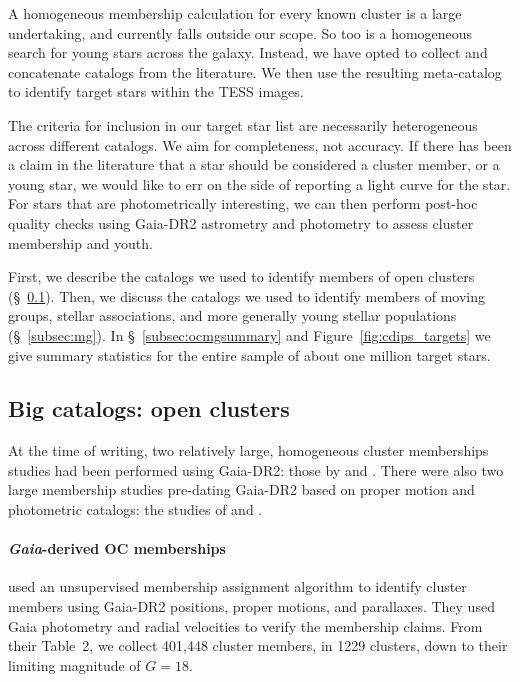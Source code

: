 \documentclass[12pt,twocolumn,tighten]{aastex62}
\begin{document}
A homogeneous membership calculation for every known cluster is a
large undertaking, and currently falls outside our scope.  So too is a
homogeneous search for young stars across the galaxy.  Instead, we
have opted to collect and concatenate catalogs from the literature.
We then use the resulting meta-catalog to identify target stars within
the TESS images.

The criteria for inclusion in our target star list are necessarily
heterogeneous across different catalogs.  We aim for completeness, not
accuracy.  If there has been a claim in the literature that a star
should be considered a cluster member, or a young star, we would like
to err on the side of reporting a light curve for the star.  For stars
that are photometrically interesting, we can then perform post-hoc
quality checks using Gaia-DR2 astrometry and photometry to assess
cluster membership and youth.

First, we describe the catalogs we used to identify members of open
clusters (\S~\ref{subsec:oc}).  Then, we discuss the catalogs we used
to identify members of moving groups, stellar associations, and more
generally young stellar populations (\S~\ref{subsec:mg}).  In
\S~\ref{subsec:ocmgsummary} and Figure~\ref{fig:cdips_targets} we give
summary statistics for the entire sample of about one million target
stars.

\subsection{Big catalogs: open clusters}
\label{subsec:oc}

At the time of writing, two relatively large, homogeneous cluster
memberships studies had been performed using Gaia-DR2: those by
\citet{cantat-gaudin_gaia_2018} and \citet{gaia_hr_2018}.  There were
also two large membership studies pre-dating Gaia-DR2 based on proper
motion and photometric catalogs: the studies of
\citet{Kharchenko_et_al_2013} and \citet{dias_proper_2014}.

\paragraph{{\it Gaia}-derived OC memberships}

\citet{cantat-gaudin_gaia_2018} used an unsupervised membership
assignment algorithm \citep{krone-martins_upmask_2014} to identify
cluster members using Gaia-DR2 positions, proper motions, and
parallaxes.  They used Gaia photometry and radial velocities to verify
the membership claims.  From their Table~2, we collect 401{,}448
cluster members, in 1229 clusters, down to their limiting magnitude of
$G=18$.
\end{document}

